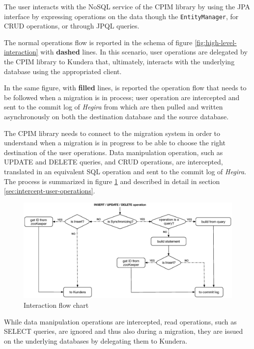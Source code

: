 \newparagraph  The user interacts with the NoSQL service of the CPIM library by using the JPA interface by expressing operations on the data though the \texttt{EntityManager}, for CRUD operations, or through JPQL queries. 

\noindent The normal operations flow is reported in the schema of figure \ref{fig:high-level-interaction} with \textbf{dashed} lines. In this scenario, user operations are delegated by the CPIM library to Kundera that, ultimately, interacts with the underlying database using the appropriated client.

\noindent In the same figure, with \textbf{filled} lines, is reported the operation flow that needs to be followed when a migration is in process; user operation are intercepted and sent to the commit log of \textit{Hegira} from which are then pulled and written asynchronously on both the destination database and the source database.
 
\noindent The CPIM library needs to connect to the migration system in order to understand when a migration is in progress to be able to choose the right destination of the user operations. Data manipulation operation, such as UPDATE and DELETE queries, and CRUD operations, are intercepted, translated in an equivalent SQL operation and sent to the commit log of \textit{Hegira}.
The process is summarized in figure \ref{fig:flow-chart} and described in detail in section \ref{sec:intercept-user-operations}.

\begin{figure}[tbh]
  \centering
  \includegraphics[width=12cm]{images/flow_chart}
  \caption{Interaction flow chart}
  \label{fig:flow-chart}
\end{figure} 

\noindent While data manipulation operations are intercepted, read operations, such as SELECT queries, are ignored and thus also during a migration, they are issued on the underlying databases by delegating them to Kundera.

